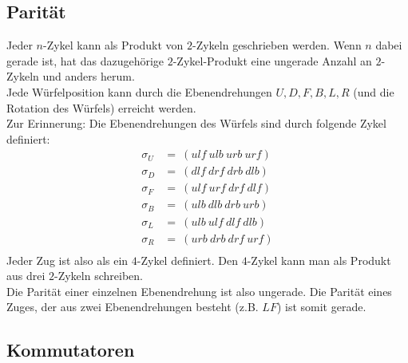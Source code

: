 \documentclass[12pt,a4paper, usenames, dvipsnames]{article}
\begin{document}
\subsection*{Parität}

Jeder $n$-Zykel kann als Produkt von $2$-Zykeln geschrieben werden. Wenn $n$ dabei gerade ist, hat das dazugehörige $2$-Zykel-Produkt eine ungerade Anzahl an $2$-Zykeln und anders herum. \cite{TD}
\\
Jede Würfelposition kann durch die Ebenendrehungen $U, D, F, B, L, R$ (und die Rotation des Würfels) erreicht werden. \\
Zur Erinnerung: Die Ebenendrehungen des Würfels sind durch folgende Zykel definiert:
\begin{align*}
\sigma_U & =\ (ulf \ ulb \ urb \ urf) \\
\sigma_D & =\ (dlf \ drf \ drb \ dlb) \\
\sigma_F & =\ (ulf \ urf \ drf \ dlf) \\
\sigma_B & =\ (ulb \ dlb \ drb \ urb) \\
\sigma_L & =\ (ulb \ ulf \ dlf \ dlb) \\
\sigma_R & =\ (urb \ drb \ drf \ urf) \\
\end{align*}
Jeder Zug ist also als ein $4$-Zykel definiert. Den $4$-Zykel kann man als Produkt aus drei $2$-Zykeln schreiben. \\
Die Parität einer einzelnen Ebenendrehung ist also ungerade. Die Parität eines Zuges, der aus zwei Ebenendrehungen besteht (z.B. $LF$) ist somit gerade.



























\subsection*{Kommutatoren}
\end{document}
